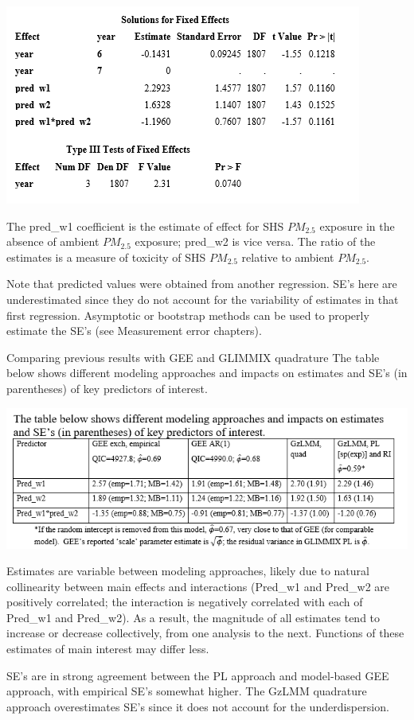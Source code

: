 \documentclass[
  9pt,
  ignorenonframetext,
]{beamer}
\begin{document}
\begin{frame}{}
\protect\hypertarget{section-5}{}
\begin{center}\includegraphics[width=0.7\linewidth]{figs_L16/f4} \end{center}

The pred\_w1 coefficient is the estimate of effect for SHS \(PM_{2.5}\)
exposure in the absence of ambient \(PM_{2.5}\) exposure; pred\_w2 is
vice versa. The ratio of the estimates is a measure of toxicity of SHS
\(PM_{2.5}\) relative to ambient \(PM_{2.5}\).

Note that predicted values were obtained from another regression. SE's
here are underestimated since they do not account for the variability of
estimates in that first regression. Asymptotic or bootstrap methods can
be used to properly estimate the SE's (see Measurement error chapters).
\end{frame}

\begin{frame}{Comparing previous results with GEE and GLIMMIX
quadrature}
\protect\hypertarget{comparing-previous-results-with-gee-and-glimmix-quadrature}{}
The table below shows different modeling approaches and impacts on
estimates and SE's (in parentheses) of key predictors of interest.

\begin{center}\includegraphics[width=0.7\linewidth]{figs_L16/f5} \end{center}

Estimates are variable between modeling approaches, likely due to
natural collinearity between main effects and interactions (Pred\_w1 and
Pred\_w2 are positively correlated; the interaction is negatively
correlated with each of Pred\_w1 and Pred\_w2). As a result, the
magnitude of all estimates tend to increase or decrease collectively,
from one analysis to the next. Functions of these estimates of main
interest may differ less.

SE's are in strong agreement between the PL approach and model-based GEE
approach, with empirical SE's somewhat higher. The GzLMM quadrature
approach overestimates SE's since it does not account for the
underdispersion.
\end{frame}
\end{document}
